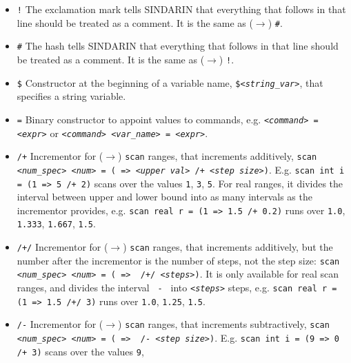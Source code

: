 \documentclass[12pt]{book}
\newcommand{\ttt}[1]{\texttt{#1}}
\begin{document}
\begin{itemize}
\item
\ttt{!} \newline
The exclamation mark tells SINDARIN that everything that follows in
that line should be treated as a comment. It is the same as ($\to$)
\ttt{\#}. 
\item
\ttt{\#} \newline
The hash tells SINDARIN that everything that follows in
that line should be treated as a comment. It is the same as ($\to$)
\ttt{!}. 
\item
\ttt{\$} \newline
Constructor at the beginning of a variable name,
\ttt{\${\em <string\_var>}}, that specifies a string variable.  
\item
\ttt{=} \newline
Binary constructor to appoint values to commands, e.g. \ttt{{\em <command>}
  = {\em <expr>}} or \newline \ttt{{\em <command>} {\em <var\_name>} =
  {\em <expr>}}.
\item
\ttt{/+} \newline
Incrementor for ($\to$) \ttt{scan} ranges, that increments additively,
\ttt{scan {\em <num\_spec> <num>} = ({\em <lower val>} => {\em <upper
    val>} /+ {\em <step
size>})}. E.g. \ttt{scan int i = (1 => 5 /+ 2)} scans over the values \ttt{1}, 
\ttt{3}, \ttt{5}. For real ranges, it divides the interval between
upper and lower bound into as many intervals as the incrementor
provides, e.g. \ttt{scan real r = (1 => 1.5 /+ 0.2)} runs over 
\ttt{1.0}, \ttt{1.333}, \ttt{1.667}, \ttt{1.5}. 
\item
\ttt{/+/} \newline
Incrementor for ($\to$) \ttt{scan} ranges, that increments additively, 
but the number after the incrementor is the number of steps, not the
step size: \ttt{scan {\em <num\_spec> <num>} = ({\em <lower val>} =>
  {\em <upper val>}
/+/ {\em <steps>})}. It is only available for real scan ranges, and divides
the interval \ttt{{\em <upper val>} - {\em <lower val>}} into
\ttt{{\em <steps>}} steps,
e.g. \ttt{scan real r = (1 => 1.5 /+/ 3)} runs over \ttt{1.0},
\ttt{1.25}, \ttt{1.5}.
\item
\ttt{/-} \newline
Incrementor for ($\to$) \ttt{scan} ranges, that increments subtractively,
\ttt{scan {\em <num\_spec>} {\em <num>} = ({\em <lower val>} => {\em <upper val>} /- {\em <step
size>})}. E.g. \ttt{scan int i = (9 => 0 /+ 3)} scans over the values \ttt{9}, 

\end{itemize}
\end{document}
